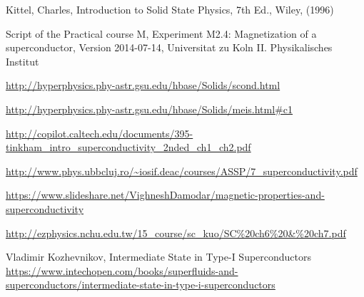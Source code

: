\documentclass[openany,11pt,a4paper]{report}
\begin{document}
\begin{thebibliography}{99}



Kittel, Charles, Introduction to Solid State Physics, 7th Ed., Wiley, (1996)


 Script of the Practical course M,
Experiment M2.4:
Magnetization of a superconductor, Version 2014-07-14, Universitat zu Koln
II. Physikalisches Institut 

 \url{http://hyperphysics.phy-astr.gsu.edu/hbase/Solids/scond.html}

 \url{http://hyperphysics.phy-astr.gsu.edu/hbase/Solids/meis.html#c1}


\url{http://copilot.caltech.edu/documents/395-tinkham_intro_superconductivity_2nded_ch1_ch2.pdf}


 \url{http://www.phys.ubbcluj.ro/~iosif.deac/courses/ASSP/7_superconductivity.pdf}

  \url{https://www.slideshare.net/VighneshDamodar/magnetic-properties-and-superconductivity}

 \url{http://ezphysics.nchu.edu.tw/15_course/sc_kuo/SC\%20ch6\%20&\%20ch7.pdf}

Vladimir Kozhevnikov, Intermediate State in Type-I Superconductors\\
 \url{https://www.intechopen.com/books/superfluids-and-superconductors/intermediate-state-in-type-i-superconductors}




\end{thebibliography}
\end{document}
